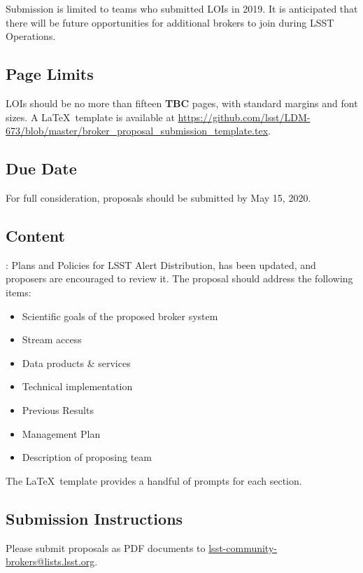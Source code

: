 \documentclass[DM,toc,lsstdraft]{lsstdoc}
\begin{document}
Submission is limited to teams who submitted LOIs in 2019.
It is anticipated that there will be future opportunities for additional brokers to join during LSST Operations.

\subsection{Page Limits}

LOIs should be no more than fifteen \textbf{TBC} pages, with standard margins and font sizes.
A \LaTeX\ template is available at \url{https://github.com/lsst/LDM-673/blob/master/broker_proposal_submission_template.tex}.

\subsection{Due Date}

For full consideration, proposals should be submitted by May 15, 2020.

\subsection{Content}


: Plans and Policies for LSST Alert Distribution, has been updated, and proposers are encouraged to review it.
The proposal should address the following items:

\begin{itemize}
	\item Scientific goals of the proposed broker system
	\item Stream access 
	\item Data products \& services
	\item Technical implementation
	\item Previous Results
	\item Management Plan
	\item Description of proposing team
\end{itemize}

The \LaTeX\ template provides a handful of prompts for each section.

\subsection{Submission Instructions}

Please submit proposals as PDF documents to \url{lsst-community-brokers@lists.lsst.org}.
\end{document}
